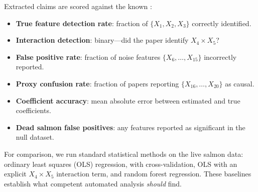 Extracted claims are scored against the known \dgp:
\begin{itemize}[leftmargin=*,itemsep=2pt,topsep=2pt]
    \item {\bf True feature detection rate}: fraction of $\{X_1, X_2, X_3\}$ correctly identified.
    \item {\bf Interaction detection}: binary---did the paper identify $X_4 \times X_5$?
    \item {\bf False positive rate}: fraction of noise features $\{X_6, \ldots, X_{15}\}$ incorrectly reported.
    \item {\bf Proxy confusion rate}: fraction of papers reporting $\{X_{16}, \ldots, X_{20}\}$ as causal.
    \item {\bf Coefficient accuracy}: mean absolute error between estimated and true coefficients.
    \item {\bf Dead salmon false positives}: any features reported as significant in the null dataset.
\end{itemize}

For comparison, we run standard statistical methods on the live salmon data: ordinary least squares (OLS) regression, \lassobaseline with cross-validation, OLS with an explicit $X_4 \times X_5$ interaction term, and random forest regression.
These baselines establish what competent automated analysis \textit{should} find.
